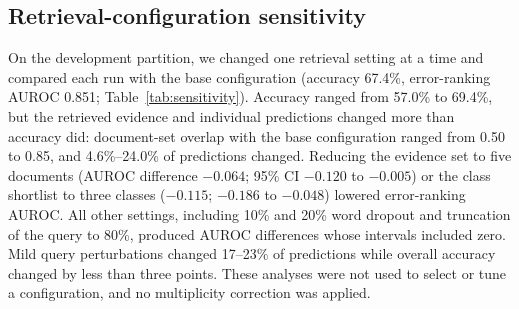 \subsection{Retrieval-configuration sensitivity}
On the development partition, we changed one retrieval setting at a time and compared each run with the base configuration (accuracy 67.4\%, error-ranking AUROC 0.851; Table~\ref{tab:sensitivity}). Accuracy ranged from 57.0\% to 69.4\%, but the retrieved evidence and individual predictions changed more than accuracy did: document-set overlap with the base configuration ranged from 0.50 to 0.85, and 4.6\%--24.0\% of predictions changed. Reducing the evidence set to five documents (AUROC difference $-0.064$; 95\% CI $-0.120$ to $-0.005$) or the class shortlist to three classes ($-0.115$; $-0.186$ to $-0.048$) lowered error-ranking AUROC. All other settings, including 10\% and 20\% word dropout and truncation of the query to 80\%, produced AUROC differences whose intervals included zero. Mild query perturbations changed 17--23\% of predictions while overall accuracy changed by less than three points. These analyses were not used to select or tune a configuration, and no multiplicity correction was applied.
